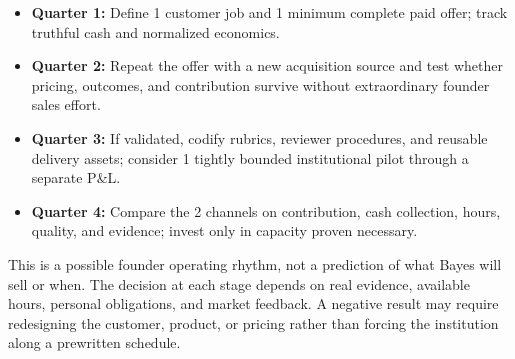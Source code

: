 \begin{itemize}
  \item \textbf{Quarter 1:} Define 1 customer job and 1 minimum complete paid offer; track truthful cash and normalized economics.
  \item \textbf{Quarter 2:} Repeat the offer with a new acquisition source and test whether pricing, outcomes, and contribution survive without extraordinary founder sales effort.
  \item \textbf{Quarter 3:} If validated, codify rubrics, reviewer procedures, and reusable delivery assets; consider 1 tightly bounded institutional pilot through a separate P\&L.
  \item \textbf{Quarter 4:} Compare the 2 channels on contribution, cash collection, hours, quality, and evidence; invest only in capacity proven necessary.
\end{itemize}

This is a possible founder operating rhythm, not a prediction of what Bayes will sell or when. The decision at each stage depends on real evidence, available hours, personal obligations, and market feedback. A negative result may require redesigning the customer, product, or pricing rather than forcing the institution along a prewritten schedule.
